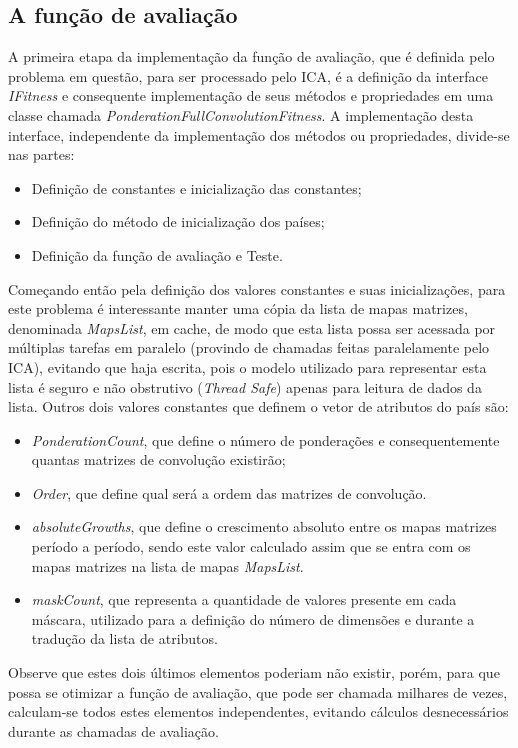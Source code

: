 \subsection{A função de avaliação}
\label{A função de avaliação}

A primeira etapa da implementação da função de avaliação, que é definida pelo problema em questão, para ser processado pelo ICA, é a definição da interface \emph{IFitness} e consequente implementação de seus métodos e propriedades em uma classe chamada \emph{PonderationFullConvolutionFitness}. A implementação desta interface, independente da implementação dos métodos ou propriedades, divide-se nas partes: 
\begin{itemize}
\item Definição de constantes e inicialização das constantes;
\item Definição do método de inicialização dos países;
\item Definição da função de avaliação e
Teste.
\end{itemize}

Começando então pela definição dos valores constantes e suas inicializações, para este problema é interessante manter uma cópia da lista de mapas matrizes, denominada \emph{MapsList}, em cache, de modo que esta lista possa ser acessada por múltiplas tarefas em paralelo (provindo de chamadas feitas paralelamente pelo ICA), evitando que haja escrita, pois o modelo utilizado para representar esta lista é seguro e não obstrutivo (\emph{Thread Safe}) apenas para leitura de dados da lista. Outros dois valores constantes que definem o vetor de atributos do país são:
\begin{itemize}
\item \emph{PonderationCount}, que define o número de ponderações e consequentemente quantas matrizes de convolução existirão;
\item \emph{Order}, que define qual será a ordem das matrizes de convolução. 
\item \emph{absoluteGrowths}, que define o crescimento absoluto entre os mapas matrizes período a período, sendo este valor calculado assim que se entra com os mapas matrizes na lista de mapas \emph{MapsList}.
\item \emph{maskCount}, que representa a quantidade de valores presente em cada máscara, utilizado para a definição do número de dimensões e durante a tradução da lista de atributos. 
\end{itemize}

Observe que estes dois últimos elementos poderiam não existir, porém, para que possa se otimizar a função de avaliação, que pode ser chamada milhares de vezes, calculam-se todos estes elementos independentes, evitando cálculos desnecessários durante as chamadas de avaliação.

